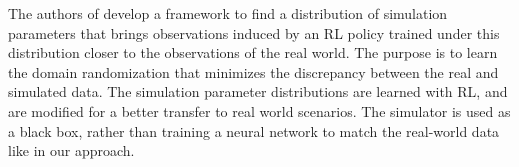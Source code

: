 The authors of \parencite{Chebotar2018} develop a framework to find a distribution of simulation parameters that brings observations induced by an RL policy trained under this distribution closer to the observations of the real world. The purpose is to learn the domain randomization that minimizes the discrepancy between the real and simulated data. The simulation parameter distributions are learned with RL, and are modified for a better transfer to real world scenarios. The simulator is used as a black box, rather than training a neural network to match the real-world data like in our approach.

